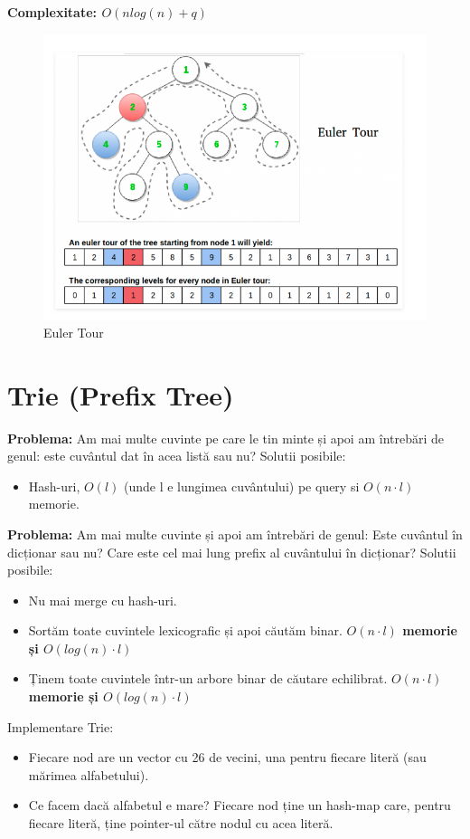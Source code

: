 \documentclass[11pt,a4paper]{article}
\theoremstyle{definition}
\theoremstyle{plain}
\theoremstyle{remark}
\begin{document}
\textbf{Complexitate:  $O(nlog(n) + q)$}

\begin{figure}[H]
    \centering
    \includegraphics[width=0.75\linewidth]{lca-euler-tour.png}
    \caption{Euler Tour}
    \label{fig:enter-label}
\end{figure}

\section{Trie (Prefix Tree)}
\textbf{Problema:} Am mai multe cuvinte pe care le tin minte și apoi am întrebări de genul: este cuvântul dat în acea listă sau nu? Solutii posibile:
\begin{itemize}
    \item Hash-uri, $O(l)$ (unde l e lungimea cuvântului) pe query si $O(n \cdot l)$ memorie.
\end{itemize}

\textbf{Problema: }
Am mai multe cuvinte și apoi am întrebări de genul:
Este cuvântul în dicționar sau nu? Care este cel mai lung preﬁx al cuvântului în dicționar? Solutii posibile:

\begin{itemize}
    \item Nu mai merge cu hash-uri.
    \item Sortăm toate cuvintele lexicograﬁc și apoi căutăm binar. \textbf{$O(n \cdot l)$ memorie și $O(log(n) \cdot l)$}
    \item Ținem toate cuvintele într-un arbore binar de căutare echilibrat. \textbf{$O(n \cdot l)$ memorie și $O(log(n) \cdot l)$}
\end{itemize}

Implementare Trie:
\begin{itemize}
    \item Fiecare nod are un vector cu 26 de vecini, una pentru ﬁecare literă (sau mărimea alfabetului).
    \item Ce facem dacă alfabetul e mare? Fiecare nod ține un hash-map care, pentru ﬁecare literă, ține pointer-ul către nodul cu acea literă.
\end{itemize}
\end{document}
